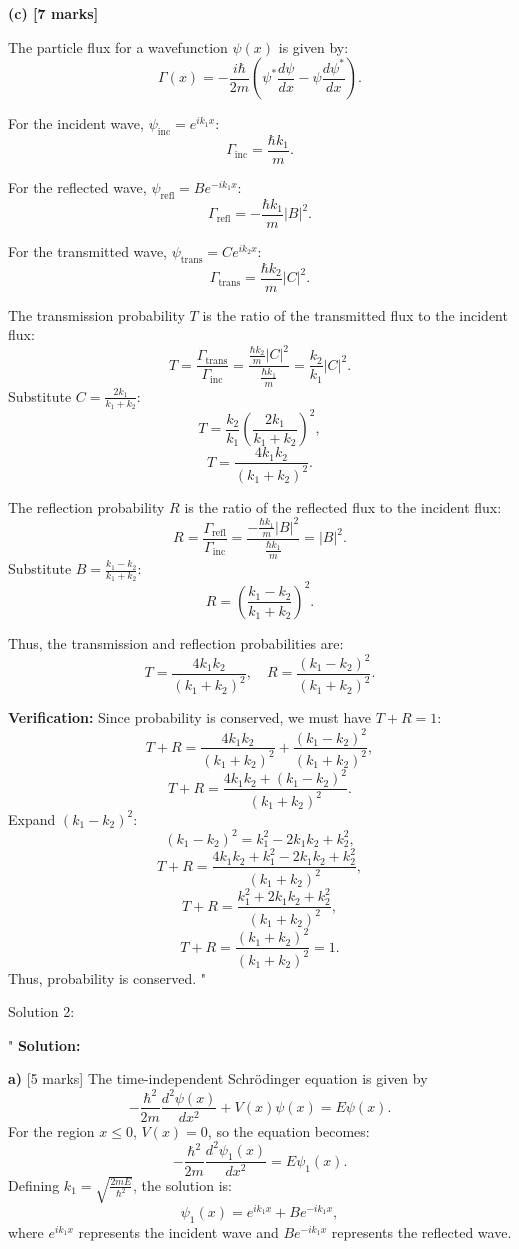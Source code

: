 \textbf{(c) [7 marks]}

The particle flux for a wavefunction $\psi(x)$ is given by:
\[
\Gamma(x) = -\frac{i\hbar}{2m} \left( \psi^* \frac{d\psi}{dx} - \psi \frac{d\psi^*}{dx} \right).
\]

For the incident wave, $\psi_\text{inc} = e^{ik_1x}$:
\[
\Gamma_\text{inc} = \frac{\hbar k_1}{m}.
\]

For the reflected wave, $\psi_\text{refl} = Be^{-ik_1x}$:
\[
\Gamma_\text{refl} = -\frac{\hbar k_1}{m} |B|^2.
\]

For the transmitted wave, $\psi_\text{trans} = Ce^{ik_2x}$:
\[
\Gamma_\text{trans} = \frac{\hbar k_2}{m} |C|^2.
\]

The transmission probability $T$ is the ratio of the transmitted flux to the incident flux:
\[
T = \frac{\Gamma_\text{trans}}{\Gamma_\text{inc}} = \frac{\frac{\hbar k_2}{m} |C|^2}{\frac{\hbar k_1}{m}} = \frac{k_2}{k_1} |C|^2.
\]
Substitute $C = \frac{2k_1}{k_1 + k_2}$:
\[
T = \frac{k_2}{k_1} \left(\frac{2k_1}{k_1 + k_2}\right)^2,
\]
\[
T = \frac{4k_1k_2}{(k_1 + k_2)^2}.
\]

The reflection probability $R$ is the ratio of the reflected flux to the incident flux:
\[
R = \frac{\Gamma_\text{refl}}{\Gamma_\text{inc}} = \frac{-\frac{\hbar k_1}{m} |B|^2}{\frac{\hbar k_1}{m}} = |B|^2.
\]
Substitute $B = \frac{k_1 - k_2}{k_1 + k_2}$:
\[
R = \left(\frac{k_1 - k_2}{k_1 + k_2}\right)^2.
\]

Thus, the transmission and reflection probabilities are:
\[
T = \frac{4k_1k_2}{(k_1 + k_2)^2}, \quad R = \frac{(k_1 - k_2)^2}{(k_1 + k_2)^2}.
\]

\textbf{Verification:} Since probability is conserved, we must have $T + R = 1$:
\[
T + R = \frac{4k_1k_2}{(k_1 + k_2)^2} + \frac{(k_1 - k_2)^2}{(k_1 + k_2)^2},
\]
\[
T + R = \frac{4k_1k_2 + (k_1 - k_2)^2}{(k_1 + k_2)^2}.
\]
Expand $(k_1 - k_2)^2$:
\[
(k_1 - k_2)^2 = k_1^2 - 2k_1k_2 + k_2^2,
\]
\[
T + R = \frac{4k_1k_2 + k_1^2 - 2k_1k_2 + k_2^2}{(k_1 + k_2)^2},
\]
\[
T + R = \frac{k_1^2 + 2k_1k_2 + k_2^2}{(k_1 + k_2)^2},
\]
\[
T + R = \frac{(k_1 + k_2)^2}{(k_1 + k_2)^2} = 1.
\]
Thus, probability is conserved.
"

Solution 2: 

"
\textbf{Solution:}

\textbf{a)} [5 marks]  
The time-independent Schrödinger equation is given by  
\[
-\frac{\hbar^2}{2m} \frac{d^2 \psi(x)}{dx^2} + V(x)\psi(x) = E\psi(x).
\]  
For the region $x \leq 0$, $V(x) = 0$, so the equation becomes:  
\[
-\frac{\hbar^2}{2m} \frac{d^2 \psi_1(x)}{dx^2} = E\psi_1(x).
\]  
Defining $k_1 = \sqrt{\frac{2mE}{\hbar^2}}$, the solution is:  
\[
\psi_1(x) = e^{ik_1x} + Be^{-ik_1x},
\]  
where $e^{ik_1x}$ represents the incident wave and $Be^{-ik_1x}$ represents the reflected wave.  

